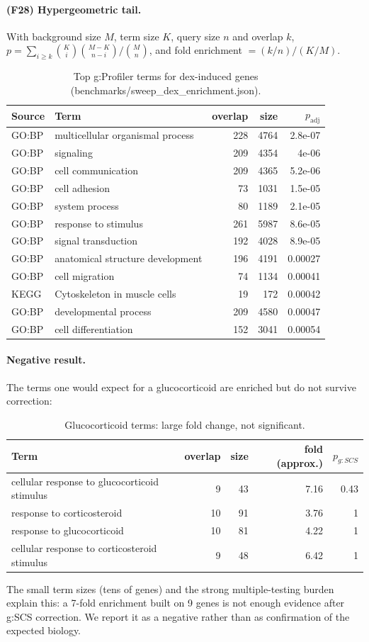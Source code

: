 \paragraph{(F28) Hypergeometric tail.} With background size $M$, term size $K$, query size $n$ and overlap $k$, $p=\sum_{i\ge k}\binom{K}{i}\binom{M-K}{n-i}\big/\binom{M}{n}$, and fold enrichment $=(k/n)/(K/M)$.
\begin{table}[h]\centering\small\begin{tabular}{llrrr}\hline Source & Term & overlap & size & $p_{\mathrm{adj}}$\\\hline
GO:BP & multicellular organismal process & 228 & 4764 & 2.8e-07\\
GO:BP & signaling & 209 & 4354 & 4e-06\\
GO:BP & cell communication & 209 & 4365 & 5.2e-06\\
GO:BP & cell adhesion & 73 & 1031 & 1.5e-05\\
GO:BP & system process & 80 & 1189 & 2.1e-05\\
GO:BP & response to stimulus & 261 & 5987 & 8.6e-05\\
GO:BP & signal transduction & 192 & 4028 & 8.9e-05\\
GO:BP & anatomical structure development & 196 & 4191 & 0.00027\\
GO:BP & cell migration & 74 & 1134 & 0.00041\\
KEGG & Cytoskeleton in muscle cells & 19 & 172 & 0.00042\\
GO:BP & developmental process & 209 & 4580 & 0.00047\\
GO:BP & cell differentiation & 152 & 3041 & 0.00054\\
\hline\end{tabular}\caption{Top g:Profiler terms for dex-induced genes (benchmarks/sweep\_dex\_enrichment.json).}\label{tab:gost}\end{table}
\paragraph{Negative result.} The terms one would expect for a glucocorticoid are enriched but do not survive correction:
\begin{table}[h]\centering\small\begin{tabular}{lrrrr}\hline Term & overlap & size & fold (approx.) & $p_{g:SCS}$\\\hline
cellular response to glucocorticoid stimulus & 9 & 43 & 7.16 & 0.43\\
response to corticosteroid & 10 & 91 & 3.76 & 1\\
response to glucocorticoid & 10 & 81 & 4.22 & 1\\
cellular response to corticosteroid stimulus & 9 & 48 & 6.42 & 1\\
\hline\end{tabular}\caption{Glucocorticoid terms: large fold change, not significant. }\end{table}
The small term sizes (tens of genes) and the strong multiple-testing burden explain this: a 7-fold enrichment built on 9 genes is not enough evidence after g:SCS correction. We report it as a negative rather than as confirmation of the expected biology.
